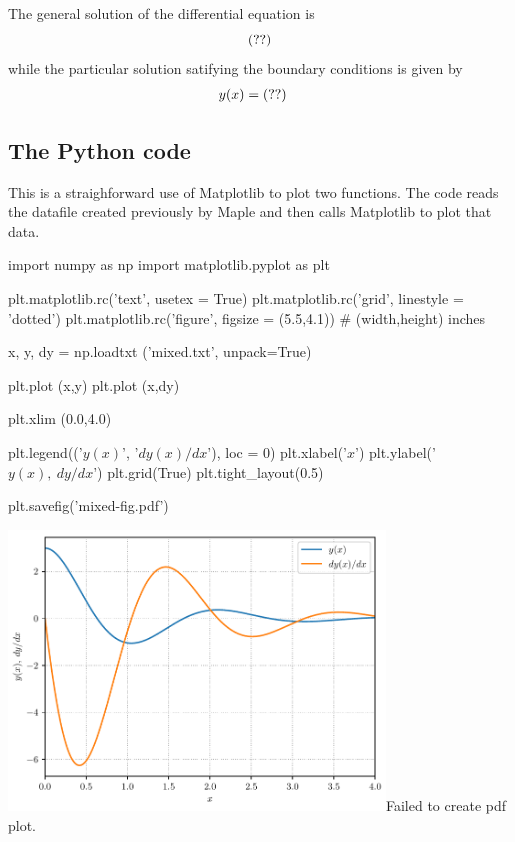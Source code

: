 \documentclass[12pt]{article}
\begin{document}
The general solution of the differential equation is
\begin{equation*}
  \mpl{ans.102}
\end{equation*}
while the particular solution satifying the boundary conditions is given by
\vspace{5pt}
\begin{align*}
    y(x) &= \mpl{ans.104}
\end{align*}

\subsection*{The Python code}

This is a straighforward use of Matplotlib to plot two functions. The code reads the datafile created previously by Maple and then calls Matplotlib to plot that data.

\begin{python}
   import numpy as np
   import matplotlib.pyplot as plt

   plt.matplotlib.rc('text', usetex = True)
   plt.matplotlib.rc('grid', linestyle = 'dotted')
   plt.matplotlib.rc('figure', figsize = (5.5,4.1)) # (width,height) inches

   x, y, dy = np.loadtxt ('mixed.txt', unpack=True)

   plt.plot (x,y)
   plt.plot (x,dy)

   plt.xlim (0.0,4.0)

   plt.legend(('$y(x)$', '$dy(x)/dx$'), loc = 0)
   plt.xlabel('$x$')
   plt.ylabel('$y(x),\> dy/dx$')
   plt.grid(True)
   plt.tight_layout(0.5)

   plt.savefig('mixed-fig.pdf')
\end{python}

\vspace{10pt}

\begin{minipage}{\textwidth}
   \centering
   {\includegraphics[width=0.75\textwidth]{mixed-fig.pdf}}{Failed to create pdf plot.}
\end{minipage}
\end{document}
